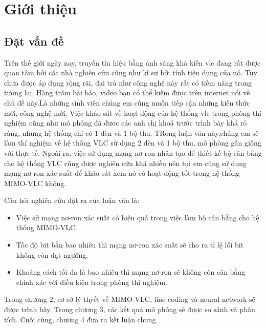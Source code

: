 \chapter{Giới thiệu} \label{sec:chuong-1} %

\section{Đặt vấn đề} \label{sec:chuong-1-datvande}
Trên thế giới ngày nay, truyền tín hiệu bằng ánh sáng khả kiến \ac{vlc} đang rất được quan tâm bởi các nhà nghiên cứu cũng như kĩ sư bởi tính tiện dụng của nó. Tuy chưa được áp dụng rộng rãi, đại trà như công nghệ này rất có tiềm năng trong tương lai. Hàng trăm bài báo, video bạn có thể kiếm được trên internet nói về chủ đề này.Là những sinh viên chúng em cũng muốn tiếp cận những kiến thức mới, công nghệ mới. Việc khảo sát về hoạt động của hệ thống \ac{vlc} trong phòng thí nghiệm cũng như mô phỏng đã đươc các anh chị khoá trước trình bày khá rỏ ràng, nhưng hệ thống chỉ có 1 đèn và 1 bộ thu. TRong luận văn này,chúng em sẽ làm thí nghiệm về hệ thống VLC sử dụng 2 đèn và 1 bộ thu, mô phòng gần giống với thực tế. Ngoài ra, việc sử dụng mạng nơ-ron nhân tạo để thiết kế bộ cân bằng cho hệ thống VLC cũng được nghiên cứu khá nhiều nên tụi em cũng sử dụng mạng nơ-ron xác suất để khảo sát xem nó có hoạt động tốt trong hệ thống MIMO-VLC không.  


\vspace{\baselineskip}
Câu hỏi nghiên cứu đặt ra của luận văn là:
\begin{itemize}
	\item Việc sử mạng nơ-ron xác suất có hiệu quả trong việc làm bộ cân bằng cho hệ thống MIMO-VLC.
	\item Tốc độ bit bằn bao nhiêu thì mạng nơ-ron xác suất sẽ cho ra tỉ lệ lỗi bit không còn đạt ngưỡng.
	\item Khoảng cách tối đa là bao nhiêu thì mạng nơ-ron sẽ không còn cân bằng chính xác với điều kiện trong phòng thí nghiệm.  
	
\end{itemize}




	Trong chương 2, cơ sở lý thyết về MIMO-VLC, line coding và neural network sẽ được trình bày. 
	Trong chương 3, các kết quả mô phỏng sẽ được so sánh và phân tích. 
	Cuối cùng, chương 4 đưa ra kết luận chung.

